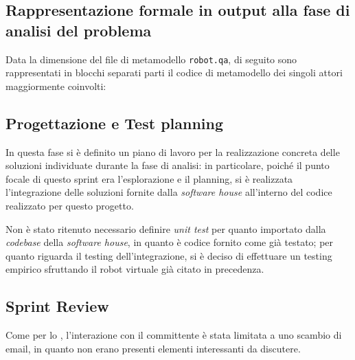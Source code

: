 \newpage

\subsection[Rappresentazione formale]{Rappresentazione formale in output alla fase di analisi del problema}

Data la dimensione del file di metamodello \texttt{robot.qa}, di seguito sono rappresentati in blocchi separati parti il codice di metamodello dei singoli attori maggiormente coinvolti:

% 







% 

% 

% 

\subsection{Progettazione e Test planning}

In questa fase si è definito un piano di lavoro per la realizzazione concreta delle soluzioni individuate durante la fase di analisi:
in particolare, poiché il punto focale di questo sprint era l'esplorazione e il planning, si è realizzata l'integrazione delle soluzioni fornite dalla \textit{software house} all'interno del codice realizzato per questo progetto.

Non è stato ritenuto necessario definire \textit{unit test} per quanto importato dalla \textit{codebase} della \textit{software house}, in quanto è codice fornito come già testato;
per quanto riguarda il testing dell'integrazione, si è deciso di effettuare un testing empirico sfruttando il robot virtuale già citato in precedenza.

\subsection{Sprint Review}

Come per lo , l'interazione con il committente è stata limitata a uno scambio di email, in quanto non erano presenti elementi interessanti da discutere.
